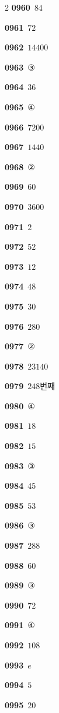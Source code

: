 \documentclass[10pt,a4paper]{article}
\begin{document}
\begin{multicols}{2}
\noindent\textbf{0960}\ $84$\par
\noindent\textbf{0961}\ $72$\par
\noindent\textbf{0962}\ $14400$\par
\noindent\textbf{0963}\ ③\par
\noindent\textbf{0964}\ $36$\par
\noindent\textbf{0965}\ ④\par
\noindent\textbf{0966}\ $7200$\par
\noindent\textbf{0967}\ $1440$\par
\noindent\textbf{0968}\ ②\par
\noindent\textbf{0969}\ $60$\par
\noindent\textbf{0970}\ $3600$\par
\noindent\textbf{0971}\ $2$\par
\noindent\textbf{0972}\ $52$\par
\noindent\textbf{0973}\ $12$\par
\noindent\textbf{0974}\ $48$\par
\noindent\textbf{0975}\ $30$\par
\noindent\textbf{0976}\ $280$\par
\noindent\textbf{0977}\ ②\par
\noindent\textbf{0978}\ $23140$\par
\noindent\textbf{0979}\ $248$번째\par
\noindent\textbf{0980}\ ④\par
\noindent\textbf{0981}\ $18$\par
\noindent\textbf{0982}\ $15$\par
\noindent\textbf{0983}\ ③\par
\noindent\textbf{0984}\ $45$\par
\noindent\textbf{0985}\ $53$\par
\noindent\textbf{0986}\ ③\par
\noindent\textbf{0987}\ $288$\par
\noindent\textbf{0988}\ $60$\par
\noindent\textbf{0989}\ ③\par
\noindent\textbf{0990}\ $72$\par
\noindent\textbf{0991}\ ④\par
\noindent\textbf{0992}\ $108$\par
\noindent\textbf{0993}\ $e$\par
\noindent\textbf{0994}\ $5$\par
\noindent\textbf{0995}\ $20$\par

\end{multicols}
\end{document}
